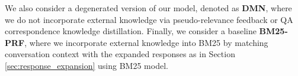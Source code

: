 We also consider a degenerated version of our model, denoted as \textbf{DMN}, where we do not incorporate external knowledge via pseudo-relevance feedback or QA correspondence knowledge distillation. Finally, we consider a baseline \textbf{BM25-PRF}, where we incorporate external knowledge into BM25 by matching conversation context with the expanded responses as in Section \ref{sec:response_expansion} using BM25 model.


